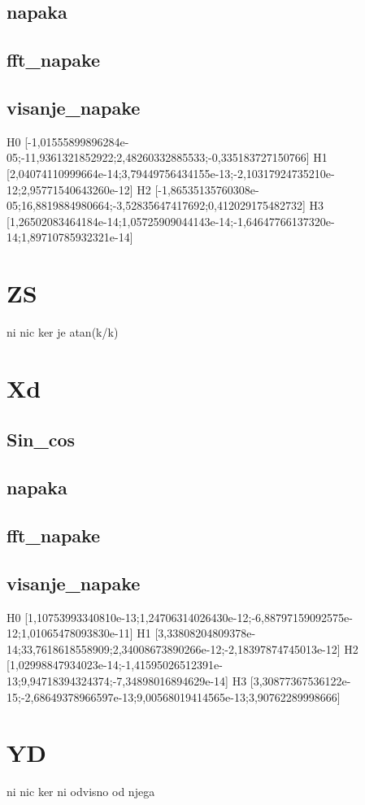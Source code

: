 \subsection{napaka}
\subsection{fft\_napake}
\subsection{visanje\_napake}

H0	[-1,01555899896284e-05;-11,9361321852922;2,48260332885533;-0,335183727150766]
H1	[2,04074110999664e-14;3,79449756434155e-13;-2,10317924735210e-12;2,95771540643260e-12]
H2	[-1,86535135760308e-05;16,8819884980664;-3,52835647417692;0,412029175482732]
H3	[1,26502083464184e-14;1,05725909044143e-14;-1,64647766137320e-14;1,89710785932321e-14]

\section{ZS}
ni nic ker je atan(k/k)
\section{Xd}
\subsection{Sin\_cos}
\subsection{napaka}
\subsection{fft\_napake}
\subsection{visanje\_napake}    

H0	[1,10753993340810e-13;1,24706314026430e-12;-6,88797159092575e-12;1,01065478093830e-11]
H1	[3,33808204809378e-14;33,7618618558909;2,34008673890266e-12;-2,18397874745013e-12]
H2	[1,02998847934023e-14;-1,41595026512391e-13;9,94718394324374;-7,34898016894629e-14]
H3	[3,30877367536122e-15;-2,68649378966597e-13;9,00568019414565e-13;3,90762289998666]

\section{YD}
ni nic ker ni odvisno od njega